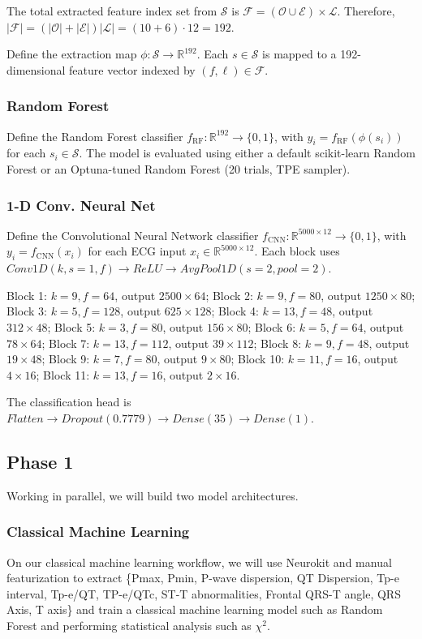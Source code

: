 \documentclass[sigconf,nonacm]{acmart}
\begin{document}
The total extracted feature index set from $\mathcal{S}$ is $\mathcal{F}=(\mathcal{O}\cup\mathcal{E})\times\mathcal{L}$.
Therefore, $|\mathcal{F}|=(|\mathcal{O}|+|\mathcal{E}|)|\mathcal{L}|=(10+6)\cdot 12=192$.

Define the extraction map $\phi:\mathcal{S}\to\mathbb{R}^{192}$.
Each $s\in\mathcal{S}$ is mapped to a 192-dimensional feature vector indexed by $(f,\ell)\in\mathcal{F}$.

\subsubsection{Random Forest}
Define the Random Forest classifier $f_{\mathrm{RF}}:\mathbb{R}^{192}\to\{0,1\}$, with $y_i=f_{\mathrm{RF}}(\phi(s_i))$ for each $s_i\in\mathcal{S}$.
The model is evaluated using either a default scikit-learn Random Forest or an Optuna-tuned Random Forest (20 trials, TPE sampler).

\subsubsection{1-D Conv. Neural Net}
Define the Convolutional Neural Network classifier $f_{\mathrm{CNN}}:\mathbb{R}^{5000 \times 12}\to\{0,1\}$, with
$y_i=f_{\mathrm{CNN}}(x_i)$ for each ECG input $x_i\in\mathbb{R}^{5000 \times 12}$.
Each block uses $Conv1D(k, s=1, f) \to ReLU \to AvgPool1D(s=2, pool=2)$.

Block 1: $k=9, f=64$, output $2500 \times 64$;
Block 2: $k=9, f=80$, output $1250 \times 80$;
Block 3: $k=5, f=128$, output $625 \times 128$;
Block 4: $k=13, f=48$, output $312 \times 48$;
Block 5: $k=3, f=80$, output $156 \times 80$;
Block 6: $k=5, f=64$, output $78 \times 64$;
Block 7: $k=13, f=112$, output $39 \times 112$;
Block 8: $k=9, f=48$, output $19 \times 48$;
Block 9: $k=7, f=80$, output $9 \times 80$;
Block 10: $k=11, f=16$, output $4 \times 16$;
Block 11: $k=13, f=16$, output $2 \times 16$.

The classification head is \\
$Flatten \to Dropout(0.7779) \to Dense(35) \to Dense(1)$.

\subsection{Phase 1}
  Working in parallel, we will build two model architectures.

  \subsubsection{Classical Machine Learning}
On our classical machine learning workflow, we will use Neurokit and manual featurization to extract \{Pmax, Pmin, P-wave dispersion, QT Dispersion, Tp-e interval, Tp-e/QT, TP-e/QTc, ST-T abnormalities, Frontal QRS-T angle, QRS Axis, T axis\} and train a classical machine learning model such as Random Forest and performing statistical analysis such as $\chi^2$.
\end{document}
